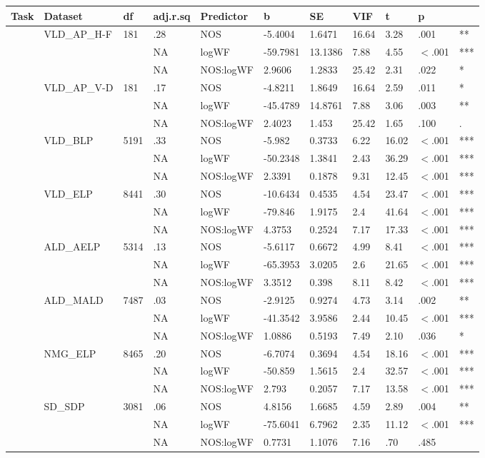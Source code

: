 \begin{table}[ht]
\centering
\begingroup\normalsize
\begin{tabular}{lllllllllll}
  \hline
Task & Dataset & df & adj.r.sq & Predictor & b & SE & VIF & t & p &  \\ 
  \hline
 & VLD\_AP\_H-F & 181 & .28 & NOS & -5.4004 & 1.6471 & 16.64 & 3.28 & .001 & ** \\ 
   &  &  & NA & logWF & -59.7981 & 13.1386 & 7.88 & 4.55 & $<$.001 & *** \\ 
   &  &  & NA & NOS:logWF & 2.9606 & 1.2833 & 25.42 & 2.31 & .022 & * \\ 
   & VLD\_AP\_V-D & 181 & .17 & NOS & -4.8211 & 1.8649 & 16.64 & 2.59 & .011 & * \\ 
   &  &  & NA & logWF & -45.4789 & 14.8761 & 7.88 & 3.06 & .003 & ** \\ 
   &  &  & NA & NOS:logWF & 2.4023 & 1.453 & 25.42 & 1.65 & .100 & . \\ 
   & VLD\_BLP & 5191 & .33 & NOS & -5.982 & 0.3733 & 6.22 & 16.02 & $<$.001 & *** \\ 
   &  &  & NA & logWF & -50.2348 & 1.3841 & 2.43 & 36.29 & $<$.001 & *** \\ 
   &  &  & NA & NOS:logWF & 2.3391 & 0.1878 & 9.31 & 12.45 & $<$.001 & *** \\ 
   & VLD\_ELP & 8441 & .30 & NOS & -10.6434 & 0.4535 & 4.54 & 23.47 & $<$.001 & *** \\ 
   &  &  & NA & logWF & -79.846 & 1.9175 & 2.4 & 41.64 & $<$.001 & *** \\ 
   &  &  & NA & NOS:logWF & 4.3753 & 0.2524 & 7.17 & 17.33 & $<$.001 & *** \\ 
   & ALD\_AELP & 5314 & .13 & NOS & -5.6117 & 0.6672 & 4.99 & 8.41 & $<$.001 & *** \\ 
   &  &  & NA & logWF & -65.3953 & 3.0205 & 2.6 & 21.65 & $<$.001 & *** \\ 
   &  &  & NA & NOS:logWF & 3.3512 & 0.398 & 8.11 & 8.42 & $<$.001 & *** \\ 
   & ALD\_MALD & 7487 & .03 & NOS & -2.9125 & 0.9274 & 4.73 & 3.14 & .002 & ** \\ 
   &  &  & NA & logWF & -41.3542 & 3.9586 & 2.44 & 10.45 & $<$.001 & *** \\ 
   &  &  & NA & NOS:logWF & 1.0886 & 0.5193 & 7.49 & 2.10 & .036 & * \\ 
   & NMG\_ELP & 8465 & .20 & NOS & -6.7074 & 0.3694 & 4.54 & 18.16 & $<$.001 & *** \\ 
   &  &  & NA & logWF & -50.859 & 1.5615 & 2.4 & 32.57 & $<$.001 & *** \\ 
   &  &  & NA & NOS:logWF & 2.793 & 0.2057 & 7.17 & 13.58 & $<$.001 & *** \\ 
   & SD\_SDP & 3081 & .06 & NOS & 4.8156 & 1.6685 & 4.59 & 2.89 & .004 & ** \\ 
   &  &  & NA & logWF & -75.6041 & 6.7962 & 2.35 & 11.12 & $<$.001 & *** \\ 
   &  &  & NA & NOS:logWF & 0.7731 & 1.1076 & 7.16 & .70 & .485 &   \\ 
   \hline
\end{tabular}
\endgroup
\end{table}
